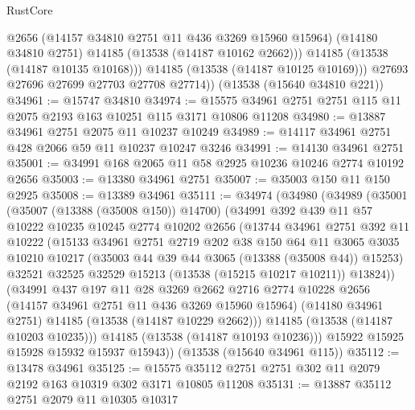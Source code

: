 \begin{lexlean}{RustCore}
\begin{coremodule}
              @2656
              (@14157 @34810 @2751 @11 @436 @3269 @15960 @15964)
              (@14180 @34810 @2751)
              @14185
              (@13538 (@14187 @10162 @2662)))
            @14185
            (@13538 (@14187 @10135 @10168)))
          @14185
          (@13538 (@14187 @10125 @10169)))
        @27693
        @27696
        @27699
        @27703
        @27708
        @27714))
    (@13538 (@15640 @34810 @221))
@34961 := @15747 @34810
@34974 := @15575 @34961 @2751 @2751 @115 @11 @2075 @2193 @163 @10251 @115 @3171 @10806 @11208
@34980 := @13887 @34961 @2751 @2075 @11 @10237 @10249
@34989 := @14117 @34961 @2751 @428 @2066 @59 @11 @10237 @10247 @3246
@34991 := @14130 @34961 @2751
@35001 := @34991 @168 @2065 @11 @58 @2925 @10236 @10246 @2774 @10192 @2656
@35003 := @13380 @34961 @2751
@35007 := @35003 @150 @11 @150 @2925
@35008 := @13389 @34961
@35111 := @34974
    (@34980
      (@34989
        (@35001
          (@35007 (@13388 (@35008 @150)) @14700)
          (@34991
            @392
            @439
            @11
            @57
            @10222
            @10235
            @10245
            @2774
            @10202
            @2656
            (@13744
              @34961
              @2751
              @392
              @11
              @10222
              (@15133
                @34961
                @2751
                @2719
                @202
                @38
                @150
                @64
                @11
                @3065
                @3035
                @10210
                @10217
                (@35003 @44 @39 @44 @3065 (@13388 (@35008 @44)) @15253)
                @32521
                @32525
                @32529
                @15213
                (@13538 (@15215 @10217 @10211))
                @13824))
            (@34991
              @437
              @197
              @11
              @28
              @3269
              @2662
              @2716
              @2774
              @10228
              @2656
              (@14157 @34961 @2751 @11 @436 @3269 @15960 @15964)
              (@14180 @34961 @2751)
              @14185
              (@13538 (@14187 @10229 @2662)))
            @14185
            (@13538 (@14187 @10203 @10235)))
          @14185
          (@13538 (@14187 @10193 @10236)))
        @15922
        @15925
        @15928
        @15932
        @15937
        @15943))
    (@13538 (@15640 @34961 @115))
@35112 := @13478 @34961
@35125 := @15575 @35112 @2751 @2751 @302 @11 @2079 @2192 @163 @10319 @302 @3171 @10805 @11208
@35131 := @13887 @35112 @2751 @2079 @11 @10305 @10317

\end{coremodule}
\end{lexlean}
